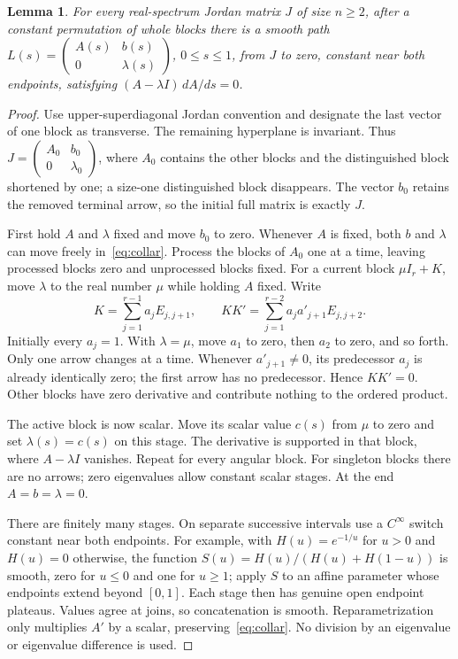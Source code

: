\documentclass[11pt]{article}
\newtheorem{lemma}{Lemma}
\begin{document}
\begin{lemma}\label{lem:path}
For every real-spectrum Jordan matrix $J$ of size $n\geq2$, after a constant
permutation of whole blocks there is a smooth path
$L(s)=\left(\begin{smallmatrix}A(s)&b(s)\\0&\lambda(s)\end{smallmatrix}\right)$,
$0\leq s\leq1$, from $J$ to zero, constant near both endpoints, satisfying
$(A-\lambda I)\,dA/ds=0$.
\end{lemma}
\begin{proof}
Use upper-superdiagonal Jordan convention and designate the last vector of
one block as transverse. The remaining hyperplane is invariant. Thus
$J=\left(\begin{smallmatrix}A_0&b_0\\0&\lambda_0\end{smallmatrix}\right)$,
where $A_0$ contains the other blocks and the distinguished block shortened
by one; a size-one distinguished block disappears. The vector $b_0$ retains
the removed terminal arrow, so the initial full matrix is exactly $J$.

First hold $A$ and $\lambda$ fixed and move $b_0$ to zero. Whenever $A$ is
fixed, both $b$ and $\lambda$ can move freely in~\eqref{eq:collar}.
Process the blocks of $A_0$ one at a time, leaving processed blocks zero and
unprocessed blocks fixed. For a current block $\mu I_r+K$, move $\lambda$
to the real number $\mu$ while holding $A$ fixed. Write
\[
 K=\sum_{j=1}^{r-1}a_jE_{j,j+1},\qquad
 KK'=\sum_{j=1}^{r-2}a_j a'_{j+1}E_{j,j+2}.
\]
Initially every $a_j=1$. With $\lambda=\mu$, move $a_1$ to zero, then
$a_2$ to zero, and so forth. Only one arrow changes at a time. Whenever
$a'_{j+1}\ne0$, its predecessor $a_j$ is already identically zero; the
first arrow has no predecessor. Hence $KK'=0$. Other blocks have zero
derivative and contribute nothing to the ordered product.

The active block is now scalar. Move its scalar value $c(s)$ from $\mu$
to zero and set $\lambda(s)=c(s)$ on this stage. The derivative is supported
in that block, where $A-\lambda I$ vanishes. Repeat for every angular block.
For singleton blocks there are no arrows; zero eigenvalues allow constant
scalar stages. At the end $A=b=\lambda=0$.

There are finitely many stages. On separate successive intervals use a
$C^\infty$ switch constant near both endpoints. For example, with
$H(u)=e^{-1/u}$ for $u>0$ and $H(u)=0$ otherwise, the function
$S(u)=H(u)/(H(u)+H(1-u))$ is smooth, zero for $u\leq0$ and one for
$u\geq1$; apply $S$ to an affine parameter whose endpoints extend beyond
$[0,1]$. Each stage then has genuine open endpoint plateaus. Values agree
at joins, so concatenation is smooth. Reparametrization only multiplies
$A'$ by a scalar, preserving~\eqref{eq:collar}. No division by an eigenvalue
or eigenvalue difference is used.
\end{proof}
\end{document}
